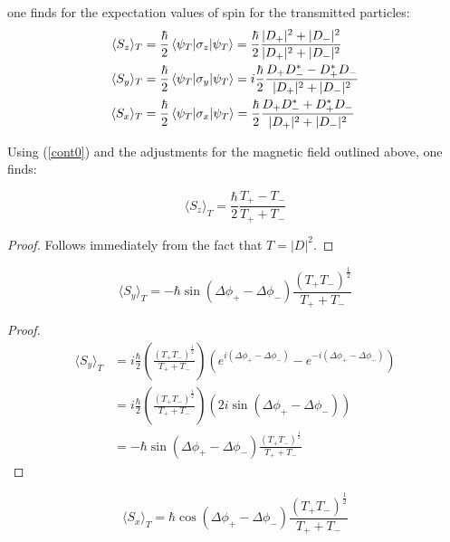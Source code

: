 \documentclass{article}
\begin{document}
\noindent one finds for the expectation values of spin for the transmitted particles:
\begin{subequations}
\begin{align}
	\langle S_z \rangle_T &= \frac{\hbar}{2}\braket{\psi_T|\sigma_z|\psi_T}=\frac{\hbar}{2}\frac{|D_+|^2+|D_-|^2}{|D_+|^2+|D_-|^2} \\
	\langle S_y \rangle_T &= \frac{\hbar}{2}\braket{\psi_T|\sigma_y|\psi_T}=i\frac{\hbar}{2}\frac{D_+D_-^*-D_+^*D_-}{|D_+|^2+|D_-|^2} \\
	\langle S_x \rangle_T &= \frac{\hbar}{2}\braket{\psi_T|\sigma_x|\psi_T}=\frac{\hbar}{2}\frac{D_+D_-^*+D_+^*D_-}{|D_+|^2+|D_-|^2}
\end{align}
\end{subequations}

\noindent Using (\ref{cont0}) and the adjustments for the magnetic field outlined above, one finds:

\begin{equation}
	\langle S_z \rangle_T = \frac{\hbar}{2}\frac{T_+-T_-}{T_++T_-}
	\label{szT}
\end{equation}


\begin{proof}
Follows immediately from the fact that $T=|D|^2$.
\end{proof}

\begin{equation}
	\langle S_y \rangle_T = -\hbar \sin{(\Delta\phi_+-\Delta\phi_-)}\frac{(T_+T_-)^{\frac{1}{2}}}{T_++T_-}
	\label{syT}
\end{equation}

\begin{proof}
\begin{subequations}
\begin{align}
	\langle S_y \rangle_T &= i\frac{\hbar}{2}\left(\frac{(T_+T_-)^{\frac{1}{2}}}{T_++T_-}\right)\left(e^{i(\Delta\phi_+-\Delta\phi_-)}-e^{-i(\Delta\phi_+-\Delta\phi_-)}\right) \\
			    &= i\frac{\hbar}{2}\left(\frac{(T_+T_-)^{\frac{1}{2}}}{T_++T_-}\right)(2i\sin{(\Delta\phi_+-\Delta\phi_-)}) \\
			    &=-\hbar \sin{(\Delta\phi_+-\Delta\phi_-)}\frac{(T_+T_-)^{\frac{1}{2}}}{T_++T_-}
\end{align}
\end{subequations}
\end{proof}

\begin{equation}
	\langle S_x \rangle_T = \hbar \cos{(\Delta\phi_+-\Delta\phi_-)}\frac{(T_+T_-)^{\frac{1}{2}}}{T_++T_-}
	\label{sxT}
\end{equation}
\end{document}
